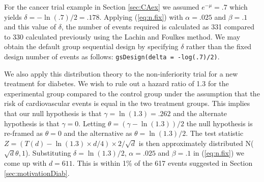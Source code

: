 For the cancer trial example in Section \ref{sec:CAex} we assumed $e^{-\mu}=.7$ which yields $\delta= -\ln(.7)/2=.178$. 
Applying (\ref{eq:n.fix}) with $\alpha=.025$ and $\beta=.1$ and this value of $\delta$, the number of events required is calculated as 331 compared to 330 calculated previously using the Lachin and Foulkes \cite{LachinFoulkes} method. 
We may obtain the default group sequential design by specifying $\delta$ rather than the fixed design number of events as follows: \texttt{gsDesign(delta = -log(.7)/2)}. 

We also apply this distribution theory to the non-inferiority trial for a new treatment for diabetes.
We wish to rule out a hazard ratio of 1.3 for the experimental group compared to the control group under the assumption that the risk of cardiovascular events is equal in the two treatment groups.
This implies that our null hypothesis is that $\gamma=\ln(1.3)=.262$ and the alternate hypothesis is that $\gamma=0$.
Letting $\theta=(\gamma-\ln(1.3))/2$ the null hypothesis is re-framed as $\theta=0$ and the alternative as $\theta=\ln(1.3)/2$. 
The test statistic $Z=(T(d)-\ln(1.3)\times d/4)\times 2/\sqrt{d}$ is then approximately distributed N($\sqrt{d}\theta,1$).
Substituting $\delta=\ln(1.3)/2$, $\alpha=.025$ and $\beta=.1$ in (\ref{eq:n.fix}) we come up with $d=611$.
This is within 1\% of the 617 events suggested in Section \ref{sec:motivationDiab}.
